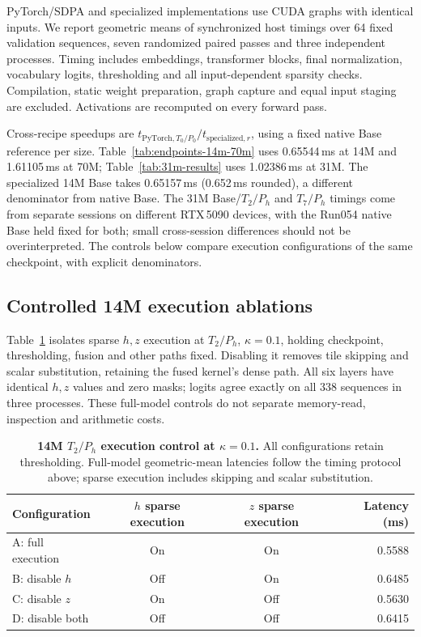 PyTorch/SDPA and specialized implementations use CUDA graphs with identical
inputs. We report geometric means of synchronized host timings over 64 fixed
validation sequences, seven randomized paired passes and three independent
processes. Timing includes embeddings, transformer blocks, final normalization,
vocabulary logits, thresholding and all input-dependent sparsity checks.
Compilation, static weight preparation, graph capture and equal input staging
are excluded. Activations are recomputed on every forward pass.

Cross-recipe speedups are $t_{\mathrm{PyTorch},T_0/P_0}/t_{\mathrm{specialized},r}$, using a fixed native Base reference per size. Table~\ref{tab:endpoints-14m-70m} uses 0.65544\,ms at 14M and 1.61105\,ms at 70M; Table~\ref{tab:31m-results} uses 1.02386\,ms at 31M. The specialized 14M Base takes 0.65157\,ms (0.652\,ms rounded), a different denominator from native Base. The 31M Base/$T_2/P_h$ and $T_7/P_h$ timings come from separate sessions on different RTX\,5090 devices, with the Run054 native Base held fixed for both; small cross-session differences should not be overinterpreted. The controls below compare execution configurations of the same checkpoint, with explicit denominators.

\subsection{Controlled 14M execution ablations}
\label{app:t2-hz-control}
Table~\ref{tab:t2-hz-control} isolates sparse $h,z$ execution at $T_2/P_h$, $\kappa=0.1$, holding checkpoint, thresholding, fusion and other paths fixed. Disabling it removes tile skipping and scalar substitution, retaining the fused kernel's dense path. All six layers have identical $h,z$ values and zero masks; logits agree exactly on all 338 sequences in three processes. These full-model controls do not separate memory-read, inspection and arithmetic costs.

\begin{table}[H]
\centering\small
\caption{\textbf{14M $T_2/P_h$ execution control at $\kappa=0.1$.}
All configurations retain thresholding. Full-model geometric-mean latencies
follow the timing protocol above; sparse execution includes skipping and
scalar substitution.}
\label{tab:t2-hz-control}
\begin{tabular}{@{}lccr@{}}
\toprule
Configuration & $h$ sparse execution & $z$ sparse execution & Latency (ms) \\
\midrule
A: full execution & On & On & 0.5588 \\
B: disable $h$ & Off & On & 0.6485 \\
C: disable $z$ & On & Off & 0.5630 \\
D: disable both & Off & Off & 0.6415 \\
\bottomrule
\end{tabular}
\end{table}

